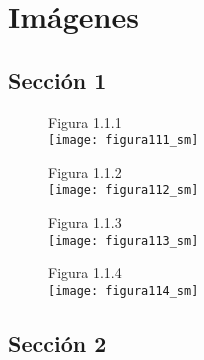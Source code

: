 \section{Imágenes}
\label{sec:imagenes}

\subsection{Sección 1}
\label{subsubsection:seccion1}

\begin{figure}
Figura 1.1.1\\
\texttt{[image: figura111\_sm]}\\
\end{figure}

\begin{figure}
Figura 1.1.2\\
\texttt{[image: figura112\_sm]}\\
\end{figure}

\begin{figure}
Figura 1.1.3\\
\texttt{[image: figura113\_sm]}\\
\end{figure}

\begin{figure}
Figura 1.1.4\\
\texttt{[image: figura114\_sm]}\\
\end{figure}


\pagebreak

\subsection{Sección 2}
\label{subsubsection:seccion2}

